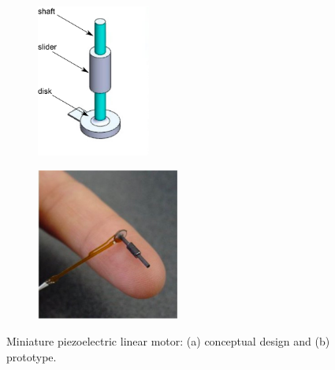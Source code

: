 \begin{figure}[ht] \centering
    \begin{subfigure}[b]{0.45\textwidth}\centering
        \includegraphics[height=5cm]{figures/piezo-miniature-a.png}
        \caption{}
        \label{fig:piezo-miniature-a}
    \end{subfigure}
    \begin{subfigure}[b]{0.45\textwidth}\centering
        \includegraphics[height=5cm]{figures/piezo-miniature-b.png}
        \caption{}
        \label{fig:piezo-miniature-b}
    \end{subfigure}
\caption[Miniature piezoelectric linear motor]{Miniature piezoelectric linear motor: (a) conceptual design and (b) prototype.}
\label{fig:piezo-miniature}
\end{figure}


